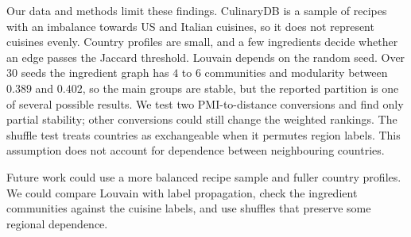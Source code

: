 Our data and methods limit these findings. CulinaryDB is a sample of
recipes with an imbalance towards US and Italian cuisines, so it does
not represent cuisines evenly. Country profiles are small, and a few
ingredients decide whether an edge passes the Jaccard threshold. Louvain
depends on the random seed. Over $30$ seeds the ingredient graph has $4$
to $6$ communities and modularity between $0.389$ and $0.402$, so the main
groups are stable, but the reported partition is one of several possible
results.
We test two PMI-to-distance conversions and find only partial stability;
other conversions could still change the weighted rankings.
The shuffle test treats countries as exchangeable when it permutes
region labels. This assumption does not account for dependence between
neighbouring countries.

Future work could use a more balanced recipe sample and fuller country profiles.
We could compare Louvain with label propagation, check the ingredient communities against the cuisine
labels, and use shuffles that preserve some regional dependence.
